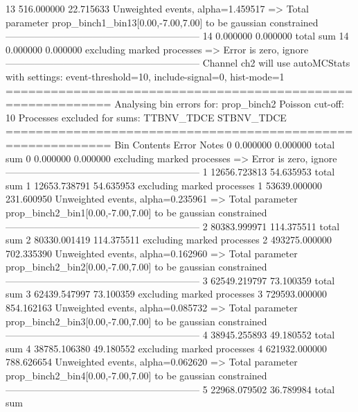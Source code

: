 13         516.000000      22.715633       Unweighted events, alpha=1.459517
  => Total parameter prop_binch1_bin13[0.00,-7.00,7.00] to be gaussian constrained
------------------------------------------------------------
14         0.000000        0.000000        total sum                     
14         0.000000        0.000000        excluding marked processes    
  => Error is zero, ignore      
------------------------------------------------------------
Channel ch2 will use autoMCStats with settings: event-threshold=10, include-signal=0, hist-mode=1
============================================================
Analysing bin errors for: prop_binch2
Poisson cut-off: 10
Processes excluded for sums: TTBNV_TDCE STBNV_TDCE
============================================================
Bin        Contents        Error           Notes                         
0          0.000000        0.000000        total sum                     
0          0.000000        0.000000        excluding marked processes    
  => Error is zero, ignore      
------------------------------------------------------------
1          12656.723813    54.635953       total sum                     
1          12653.738791    54.635953       excluding marked processes    
1          53639.000000    231.600950      Unweighted events, alpha=0.235961
  => Total parameter prop_binch2_bin1[0.00,-7.00,7.00] to be gaussian constrained
------------------------------------------------------------
2          80383.999971    114.375511      total sum                     
2          80330.001419    114.375511      excluding marked processes    
2          493275.000000   702.335390      Unweighted events, alpha=0.162960
  => Total parameter prop_binch2_bin2[0.00,-7.00,7.00] to be gaussian constrained
------------------------------------------------------------
3          62549.219797    73.100359       total sum                     
3          62439.547997    73.100359       excluding marked processes    
3          729593.000000   854.162163      Unweighted events, alpha=0.085732
  => Total parameter prop_binch2_bin3[0.00,-7.00,7.00] to be gaussian constrained
------------------------------------------------------------
4          38945.255893    49.180552       total sum                     
4          38785.106380    49.180552       excluding marked processes    
4          621932.000000   788.626654      Unweighted events, alpha=0.062620
  => Total parameter prop_binch2_bin4[0.00,-7.00,7.00] to be gaussian constrained
------------------------------------------------------------
5          22968.079502    36.789984       total sum                     
